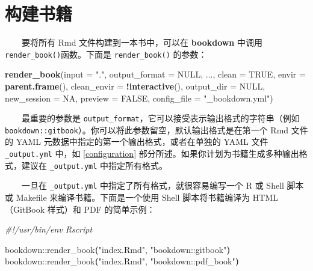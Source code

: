 \documentclass[
  12pt,
]{krantz}
\newenvironment{Shaded}{\begin{snugshade}}{\end{snugshade}}
\newcommand{\AttributeTok}[1]{\textcolor[rgb]{0.13,0.29,0.53}{#1}}
\newcommand{\CommentTok}[1]{\textcolor[rgb]{0.56,0.35,0.01}{\textit{#1}}}
\newcommand{\ConstantTok}[1]{\textcolor[rgb]{0.56,0.35,0.01}{#1}}
\newcommand{\ErrorTok}[1]{\textcolor[rgb]{0.64,0.00,0.00}{\textbf{#1}}}
\newcommand{\ExtensionTok}[1]{#1}
\newcommand{\FunctionTok}[1]{\textcolor[rgb]{0.13,0.29,0.53}{\textbf{#1}}}
\newcommand{\KeywordTok}[1]{\textcolor[rgb]{0.13,0.29,0.53}{\textbf{#1}}}
\newcommand{\NormalTok}[1]{#1}
\newcommand{\SpecialCharTok}[1]{\textcolor[rgb]{0.81,0.36,0.00}{\textbf{#1}}}
\newcommand{\StringTok}[1]{\textcolor[rgb]{0.31,0.60,0.02}{#1}}
\theoremstyle{definition}
\theoremstyle{definition}
\theoremstyle{definition}
\theoremstyle{definition}
\theoremstyle{remark}
\begin{document}
\hypertarget{build-the-book}{%
\section{构建书籍}\label{build-the-book}}

  要将所有 Rmd 文件构建到一本书中，可以在 \textbf{bookdown} 中调用 \texttt{render\_book()}函数。下面是 \texttt{render\_book()} 的参数：

\begin{Shaded}
\begin{Highlighting}[]
\FunctionTok{render\_book}\NormalTok{(}\AttributeTok{input =} \StringTok{"."}\NormalTok{, }\AttributeTok{output\_format =} \ConstantTok{NULL}\NormalTok{, ...,}
  \AttributeTok{clean =} \ConstantTok{TRUE}\NormalTok{, }\AttributeTok{envir =} \FunctionTok{parent.frame}\NormalTok{(),}
  \AttributeTok{clean\_envir =} \SpecialCharTok{!}\FunctionTok{interactive}\NormalTok{(), }\AttributeTok{output\_dir =} \ConstantTok{NULL}\NormalTok{,}
  \AttributeTok{new\_session =} \ConstantTok{NA}\NormalTok{, }\AttributeTok{preview =} \ConstantTok{FALSE}\NormalTok{,}
  \AttributeTok{config\_file =} \StringTok{"\_bookdown.yml"}\NormalTok{)}
\end{Highlighting}
\end{Shaded}

  最重要的参数是 \texttt{output\_format}，它可以接受表示输出格式的字符串（例如 \texttt{\textquotesingle{}bookdown::gitbook\textquotesingle{}}）。你可以将此参数留空，默认输出格式是在第一个 Rmd 文件的 YAML 元数据中指定的第一个输出格式，或者在单独的 YAML 文件 \texttt{\_output.yml} 中，如 \ref{configuration} 部分所述。如果你计划为书籍生成多种输出格式，建议在 \texttt{\_output.yml} 中指定所有格式。

  一旦在 \texttt{\_output.yml} 中指定了所有格式，就很容易编写一个 R 或 Shell 脚本或 Makefile 来编译书籍。下面是一个使用 Shell 脚本将书籍编译为 HTML（GitBook 样式）和 PDF 的简单示例：

\begin{Shaded}
\begin{Highlighting}[]
\CommentTok{\#!/usr/bin/env Rscript}

\ExtensionTok{bookdown::render\_book}\ErrorTok{(}\StringTok{"index.Rmd"}\ExtensionTok{,} \StringTok{"bookdown::gitbook"}\KeywordTok{)}
\ExtensionTok{bookdown::render\_book}\ErrorTok{(}\StringTok{"index.Rmd"}\ExtensionTok{,} \StringTok{"bookdown::pdf\_book"}\KeywordTok{)}
\end{Highlighting}
\end{Shaded}
\end{document}
